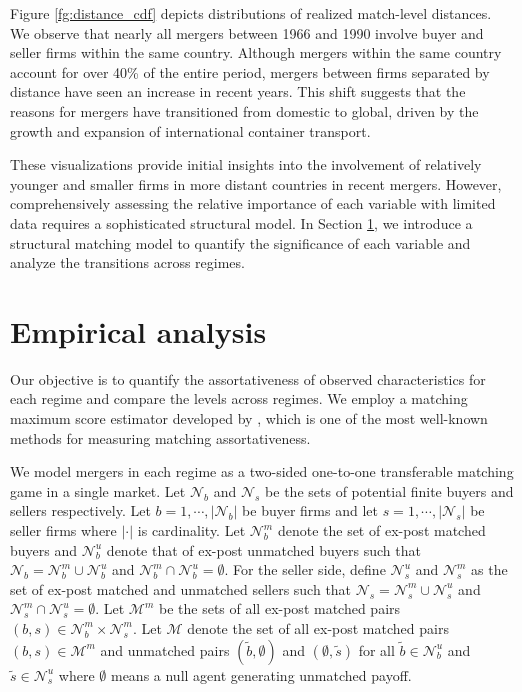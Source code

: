 \documentclass[10pt]{article}
\begin{document}
Figure \ref{fg:distance_cdf} depicts distributions of realized match-level distances.
We observe that nearly all mergers between 1966 and 1990 involve buyer and seller firms within the same country. 
Although mergers within the same country account for over 40\% of the entire period, mergers between firms separated by distance have seen an increase in recent years. 
This shift suggests that the reasons for mergers have transitioned from domestic to global, driven by the growth and expansion of international container transport.

These visualizations provide initial insights into the involvement of relatively younger and smaller firms in more distant countries in recent mergers. 
However, comprehensively assessing the relative importance of each variable with limited data requires a sophisticated structural model. 
In Section \ref{sec:empirical_analysis}, we introduce a structural matching model to quantify the significance of each variable and analyze the transitions across regimes.




\section{Empirical analysis}\label{sec:empirical_analysis}

Our objective is to quantify the assortativeness of observed characteristics for each regime and compare the levels across regimes. 
We employ a matching maximum score estimator developed by \cite{fox2018qe}, which is one of the most well-known methods for measuring matching assortativeness.

We model mergers in each regime as a two-sided one-to-one transferable matching game in a single market. Let $\mathcal{N}_b$ and $\mathcal{N}_s$ be the sets of potential finite buyers and sellers respectively. Let $b=1,\cdots,|\mathcal{N}_b|$ be buyer firms and let $s=1,\cdots,|\mathcal{N}_s|$ be seller firms where $|\cdot|$ is cardinality. Let $\mathcal{N}_{b}^{m}$ denote the set of ex-post matched buyers and $\mathcal{N}_{b}^{u}$ denote that of ex-post unmatched buyers such that $\mathcal{N}_b= \mathcal{N}_{b}^{m}\cup\mathcal{N}_{b}^{u}$ and $\mathcal{N}_{b}^{m}\cap\mathcal{N}_{b}^{u}=\emptyset$. For the seller side, define $\mathcal{N}_{s}^{u}$ and $\mathcal{N}_{s}^{m}$ as the set of ex-post matched and unmatched sellers such that $\mathcal{N}_s= \mathcal{N}_{s}^{m}\cup\mathcal{N}_{s}^{u}$ and $\mathcal{N}_{s}^{m}\cap\mathcal{N}_{s}^{u}=\emptyset$. Let $\mathcal{M}^m$ be the sets of all ex-post matched pairs $(b,s)\in\mathcal{N}_{b}^{m}\times \mathcal{N}_{s}^{m}$. Let $\mathcal{M}$ denote the set of all ex-post matched pairs $(b,s)\in\mathcal{M}^{m}$ and unmatched pairs $(\tilde{b},\emptyset)$ and $(\emptyset,\tilde{s})$ for all $\tilde{b}\in \mathcal{N}_b^u$ and $\tilde{s}\in \mathcal{N}_s^u$ where $\emptyset$ means a null agent generating unmatched payoff. 
\end{document}
